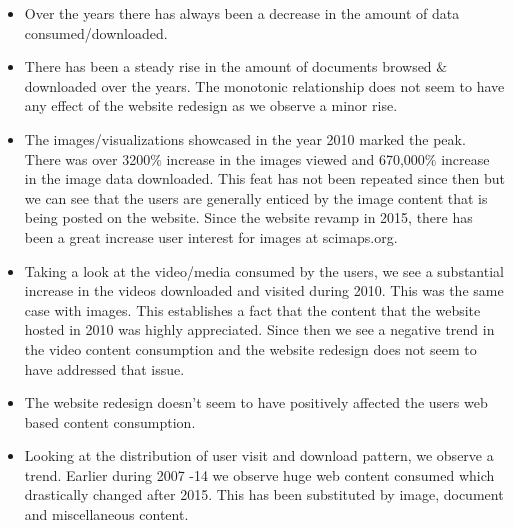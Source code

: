 \begin{itemize}
\item Over the years there has always been a decrease in the amount of data consumed/downloaded. 
\item There has been a steady rise in the amount of documents browsed $\&$ downloaded over the years. The monotonic relationship does not seem to have any effect of the website redesign as we observe a minor rise.  
\item The images/visualizations showcased in the year 2010 marked the peak. There was over 3200$\%$ increase in the images viewed and 670,000$\%$ increase in the image data downloaded. This feat has not been repeated since then but we can see that the users are generally enticed by the image content that is being posted on the website. Since the website revamp in 2015, there has been a great increase user interest for images at scimaps.org.
\item  Taking a look at the video/media consumed by the users, we see a substantial increase in the videos downloaded and visited during 2010. This was the same case with images. This establishes a fact that the content that the website hosted in 2010 was highly appreciated. Since then we see a negative trend in the video content consumption and the website redesign does not seem to have addressed that issue.
\item The website redesign doesn’t seem to have positively affected the users web based content consumption. 
\item Looking at the distribution of user visit and download pattern, we observe a trend. Earlier during 2007 -14 we observe huge web content consumed which drastically changed after 2015. This has been substituted by image, document and miscellaneous content.
\end{itemize}
